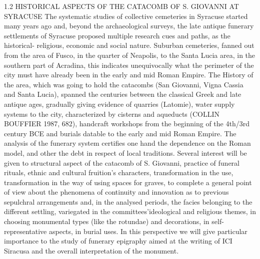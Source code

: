 \documentclass[amsthm,ebook]{saparticle}
\begin{document}
1.2 HISTORICAL ASPECTS OF THE CATACOMB OF S. GIOVANNI AT SYRACUSE
The systematic studies of collective cemeteries in Syracuse started many years ago and, beyond the archaeological surveys, the late antique funerary settlements of Syracuse proposed multiple research cues and paths, as the historical- religious, economic and social nature.
Suburban cemeteries, fanned out from the area of Fusco, in the quarter of Neapolis, to the Santa Lucia area, in the southern part of Acradina, this indicates unequivocally what the perimeter of the city must have already been in the early and mid Roman Empire. The History of the area, which was going to hold the catacombs (San Giovanni, Vigna Cassia and Santa Lucia), spanned the centuries between the classical Greek and late antique ages, gradually giving evidence of quarries (Latomie), water supply systems to the city, characterized by cisterns and aqueducts (COLLIN BOUFFIER 1987, 682), handcraft workshops from the beginning of the 4th/3rd century BCE and burials datable to the early and mid Roman Empire. The analysis of the funerary system certifies one hand the dependence on the Roman model, and other the debt in respect of local traditions.
Several interest will be given to structural aspect of the catacomb of S. Giovanni, practice of funeral rituals, ethnic and cultural fruition’s characters, transformation in the use, transformation in the way of using spaces for graves, to complete a general point of view about the phenomena of continuity and innovation as to previous sepulchral arrangements and, in the analysed periods, the facies belonging to the different settling, variegated in the committees’ideological and religious themes, in choosing monumental types (like the rotundae) and decorations, in self-representative aspects, in burial uses. In this perspective we will give particular importance to the study of funerary epigraphy aimed at the writing of ICI Siracusa and the overall interpretation of the monument.
\end{document}
